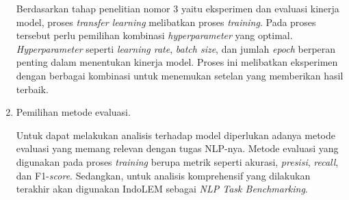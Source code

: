 \begin{enumerate}
    Berdasarkan tahap penelitian nomor 3 yaitu eksperimen dan evaluasi kinerja model, proses \textit{transfer learning} melibatkan proses \textit{training}. Pada proses tersebut perlu pemilihan kombinasi \textit{hyperparameter} yang optimal. \textit{Hyperparameter} seperti \textit{learning rate}, \textit{batch size}, dan jumlah \textit{epoch} berperan penting dalam menentukan kinerja model. Proses ini melibatkan eksperimen dengan berbagai kombinasi untuk menemukan setelan yang memberikan hasil terbaik. 
    
    \item Pemilihan metode evaluasi.
    
    Untuk dapat melakukan analisis terhadap model diperlukan adanya metode evaluasi yang memang relevan dengan tugas NLP-nya. Metode evaluasi yang digunakan pada proses \textit{training} berupa metrik seperti akurasi, \textit{presisi}, \textit{recall}, dan F1-\textit{score}. Sedangkan, untuk analisis komprehensif yang dilakukan terakhir akan digunakan IndoLEM sebagai \textit{NLP Task Benchmarking}.

\end{enumerate}
